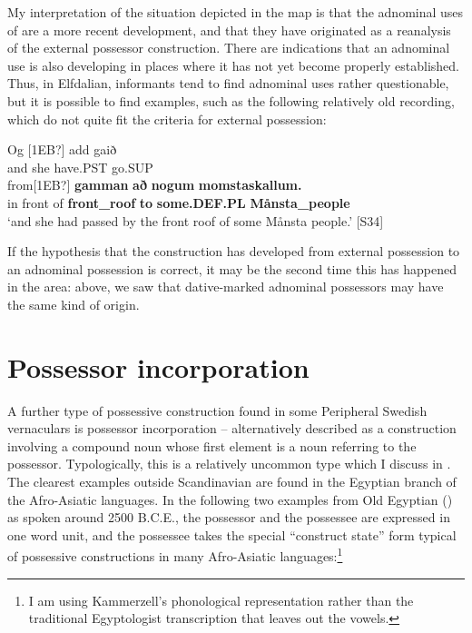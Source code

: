 My interpretation of the situation depicted in the map is that the adnominal uses of are a more recent development, and that they have originated as a reanalysis of the external possessor construction. There are indications that an adnominal use is also developing in places where it has not yet become properly established. Thus, in Elfdalian, informants tend to find adnominal uses rather questionable, but it is possible to find examples, such as the following relatively old recording, which do not quite fit the criteria for external possession: 

\ea\label{}
\gll Og  [1EB?]  add  gaið\\
and  she  have.PST  go.SUP\\
\gll from[1EB?]  \textbf{gamman} \textbf{að} \textbf{nogum} \textbf{momstaskallum.}\\
in front of   \textbf{front\_roof} \textbf{to} \textbf{some.DEF.PL} \textbf{Månsta\_people}\\
\glt ‘and she had passed by the front roof of some Månsta people.’ [S34]
\z

If the hypothesis that the  construction has developed from external possession to an adnominal possession is correct, it may be the second time this has happened in the area: above, we saw that dative-marked adnominal possessors may have the same kind of origin. 

\section{Possessor incorporation}

A further type of possessive construction found in some Peripheral Swedish vernaculars is possessor incorporation – alternatively described as a construction involving a compound noun whose first element is a noun referring to the possessor. Typologically, this is a relatively uncommon type which I discuss in \citet{Dahl2004}. The clearest examples outside Scandinavian are found in the Egyptian branch of the Afro-Asiatic languages. In the following two examples from Old Egyptian (\citet{Kammerzell2000}) as spoken around 2500 B.C.E., the possessor and the possessee are expressed in one word unit, and the possessee takes the special “construct state” form typical of possessive constructions in many Afro-Asiatic languages:\footnote{ I am using Kammerzell’s phonological representation rather than the traditional Egyptologist transcription that leaves out the vowels.}

